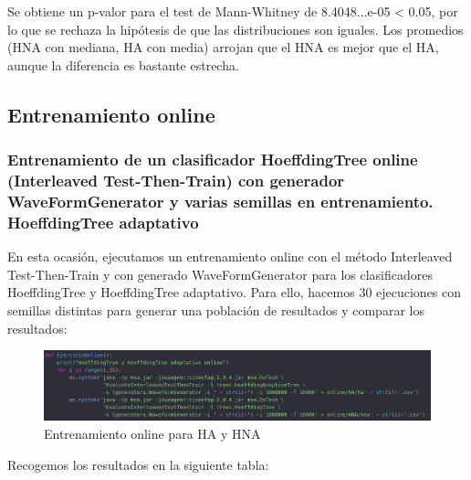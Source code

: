 Se obtiene un p-valor para el test de Mann-Whitney de 8.4048...e-05 < 0.05, por lo que se rechaza la hipótesis de que las distribuciones son iguales. Los promedios (HNA con mediana, HA con media) arrojan que el HNA es mejor que el HA, aunque la diferencia es bastante estrecha. 

\subsection{Entrenamiento online}

\subsubsection{Entrenamiento de un clasificador HoeffdingTree online (Interleaved Test-Then-Train) con generador WaveFormGenerator y varias semillas en entrenamiento. HoeffdingTree adaptativo}

En esta ocasión, ejecutamos un entrenamiento online con el método Interleaved Test-Then-Train y con generado WaveFormGenerator para los clasificadores HoeffdingTree y HoeffdingTree adaptativo. Para ello, hacemos 30 ejecuciones con semillas distintas para generar una población de resultados y comparar los resultados:

\begin{figure}[H] %
	\centering
	\includegraphics[scale=0.4]{onl1.png}  %
	\caption{Entrenamiento online para HA y HNA} 
	\label{fig:onl1}
\end{figure}

Recogemos los resultados en la siguiente tabla:

